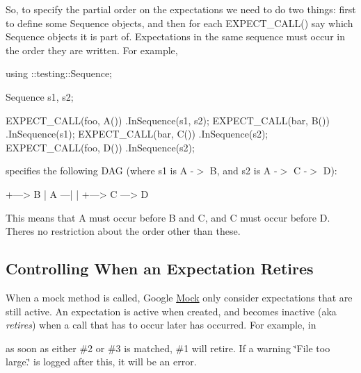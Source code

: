 So, to specify the partial order on the expectations we need to do two things\+: first to define some {\ttfamily Sequence} objects, and then for each {\ttfamily E\+X\+P\+E\+C\+T\+\_\+\+C\+A\+L\+L()} say which {\ttfamily Sequence} objects it is part of. Expectations in the same sequence must occur in the order they are written. For example,


\begin{DoxyCode}
using ::testing::Sequence;

Sequence s1, s2;

EXPECT\_CALL(foo, A())
    .InSequence(s1, s2);
EXPECT\_CALL(bar, B())
    .InSequence(s1);
EXPECT\_CALL(bar, C())
    .InSequence(s2);
EXPECT\_CALL(foo, D())
    .InSequence(s2);
\end{DoxyCode}


specifies the following D\+AG (where {\ttfamily s1} is {\ttfamily A -\/$>$ B}, and {\ttfamily s2} is {\ttfamily A -\/$>$ C -\/$>$ D})\+:


\begin{DoxyCode}
     +---> B
     |
A ---|
     |
     +---> C ---> D
\end{DoxyCode}


This means that A must occur before B and C, and C must occur before D. There\textquotesingle{}s no restriction about the order other than these.

\subsection*{Controlling When an Expectation Retires}

When a mock method is called, Google \hyperlink{class_mock}{Mock} only consider expectations that are still active. An expectation is active when created, and becomes inactive (aka {\itshape retires}) when a call that has to occur later has occurred. For example, in




as soon as either \#2 or \#3 is matched, \#1 will retire. If a warning {\ttfamily \char`\"{}\+File too large.\char`\"{}} is logged after this, it will be an error.

